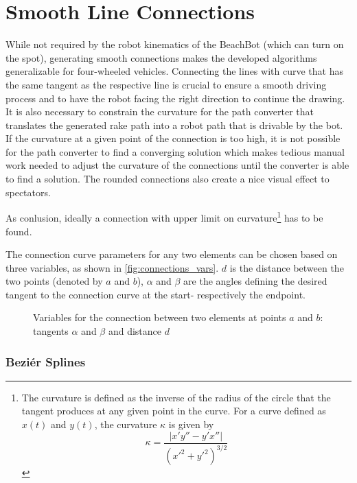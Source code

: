 \section{Smooth Line Connections}

While not required by the robot kinematics of the BeachBot (which can turn on the spot), generating smooth connections 
makes the developed algorithms generalizable for four-wheeled vehicles. Connecting the lines with curve that has the same tangent as the respective line is crucial to ensure a smooth driving process and to have the robot facing the right direction to continue the drawing.
It is also necessary to constrain the curvature for the path converter that translates the generated rake path into a robot path that is drivable by the bot. If the curvature at a given point of the connection is too high, it is not possible for the path converter to find a converging solution which makes tedious manual work needed to adjust the curvature of the connections until the converter is able to find a solution. The rounded connections also create a nice visual effect to spectators.

As conlusion, ideally a connection with upper limit on curvature\footnote{The curvature is defined as the inverse of the radius of the circle that the tangent produces at any given point in the curve. For a curve defined as $x(t)$ and $y(t)$, the curvature $\kappa$ is given by
\begin{equation}
\kappa = \frac{|x'y''-y'x''|}{(x'^2+y'^2)^{3/2}}
\end{equation}
} has to be found.

The connection curve parameters for any two elements can be chosen based on three variables, as shown in \autoref{fig:connections_vars}. $d$ is the distance between the two points (denoted by $a$ and $b$), $\alpha$ and $\beta$ are the angles defining the desired tangent to the connection curve at the start- respectively the endpoint.

\begin{figure}


\caption{Variables for the connection between two elements at points $a$ and $b$: tangents $\alpha$ and $\beta$ and distance $d$}\label{fig:connection_vars}
\end{figure}


\subsubsection{Beziér Splines}

